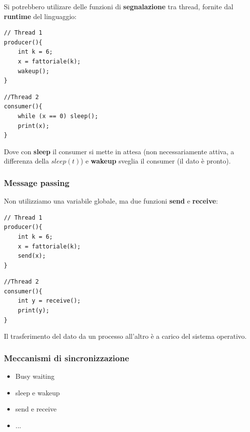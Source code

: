 \documentclass[a4paper,10pt]{article}
\begin{document}
Si potrebbero utilizare delle funzioni di \textbf{segnalazione} tra thread, fornite dal \textbf{runtime} del linguaggio:

 \begin{multicols}{2}
  \begin{lstlisting}
// Thread 1
producer(){
    int k = 6;
    x = fattoriale(k);
    wakeup();
}
\end{lstlisting}
\begin{lstlisting}
//Thread 2
consumer(){
    while (x == 0) sleep();
    print(x);
}
\end{lstlisting}

\end{multicols}

Dove con \textbf{sleep} il consumer si mette in attesa (non necessariamente attiva, a differenza della $sleep(t)$) e \textbf{wakeup} sveglia il consumer (il dato è pronto).


\subsubsection{Message passing}

Non utilizziamo una variabile globale, ma due funzioni \textbf{send} e \textbf{receive}:

 \begin{multicols}{2}
  \begin{lstlisting}
// Thread 1
producer(){
    int k = 6;
    x = fattoriale(k);
    send(x);
}
\end{lstlisting}
\begin{lstlisting}
//Thread 2
consumer(){
    int y = receive();
    print(y);
}
 \end{lstlisting}

 
\end{multicols}

 Il trasferimento del dato da un processo all'altro è a carico del sistema operativo.

\subsubsection{Meccanismi di sincronizzazione}
\begin{itemize}
 \item Busy waiting
 \item sleep e wakeup
 \item send e receive
 \item ...
\end{itemize}
\end{document}
